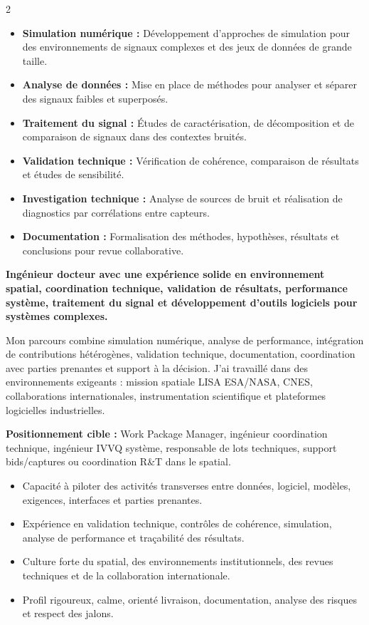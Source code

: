 \documentclass[8pt,a4paper,ragged2e,withhyper]{altacv}
\begin{document}
\begin{paracol}{2}
\begin{itemize}
  \item \textbf{Simulation numérique :} Développement d’approches de simulation pour des environnements de signaux complexes et des jeux de données de grande taille.
  \item \textbf{Analyse de données :} Mise en place de méthodes pour analyser et séparer des signaux faibles et superposés.
  \item \textbf{Traitement du signal :} Études de caractérisation, de décomposition et de comparaison de signaux dans des contextes bruités.
  \item \textbf{Validation technique :} Vérification de cohérence, comparaison de résultats et études de sensibilité.
  \item \textbf{Investigation technique :} Analyse de sources de bruit et réalisation de diagnostics par corrélations entre capteurs.
  \item \textbf{Documentation :} Formalisation des méthodes, hypothèses, résultats et conclusions pour revue collaborative.
\end{itemize}

\switchcolumn


\textbf{Ingénieur docteur avec une expérience solide en environnement spatial, coordination technique, validation de résultats, performance système, traitement du signal et développement d’outils logiciels pour systèmes complexes.}

Mon parcours combine simulation numérique, analyse de performance, intégration de contributions hétérogènes, validation technique, documentation, coordination avec parties prenantes et support à la décision. J’ai travaillé dans des environnements exigeants : mission spatiale LISA ESA/NASA, CNES, collaborations internationales, instrumentation scientifique et plateformes logicielles industrielles.

\medskip

\textbf{Positionnement cible :} Work Package Manager, ingénieur coordination technique, ingénieur IVVQ système, responsable de lots techniques, support bids/captures ou coordination R\&T dans le spatial.

\begin{itemize}
  \item Capacité à piloter des activités transverses entre données, logiciel, modèles, exigences, interfaces et parties prenantes.
  \item Expérience en validation technique, contrôles de cohérence, simulation, analyse de performance et traçabilité des résultats.
  \item Culture forte du spatial, des environnements institutionnels, des revues techniques et de la collaboration internationale.
  \item Profil rigoureux, calme, orienté livraison, documentation, analyse des risques et respect des jalons.
\end{itemize}


\end{paracol}
\end{document}
